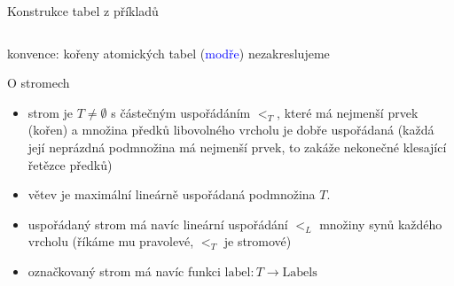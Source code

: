 \documentclass{beamer}
\begin{document}
\begin{frame}{Konstrukce tabel z příkladů}
\begin{center}
{\begin{columns}
    \end{columns}

    }

    \pause
    \alert{konvence:} kořeny atomických tabel (\textcolor{blue}{modře}) nezakreslujeme   

    \end{center}    

\end{frame}


\begin{frame}{O stromech}
    
    \begin{itemize}
        \item \alert{strom} je $T\neq\emptyset$ s částečným uspořádáním $<_T$, které má nejmenší prvek (\alert{kořen}) a množina předků libovolného vrcholu je \alert{dobře uspořádaná} \pause(každá její neprázdná podmnožina má nejmenší prvek, to zakáže nekonečné klesající řetězce předků)\pause
        \item \alert{větev} je maximální lineárně uspořádaná podmnožina $T$.\pause
        \item \alert{uspořádaný strom} má navíc lineární uspořádání $<_L$ množiny synů každého vrcholu (říkáme mu \alert{pravolevé}, $<_T$ je \alert{stromové})\pause
        \item \alert{označkovaný strom} má navíc funkci $\mathrm{label}\colon T\to\mathrm{Labels}$        
    \end{itemize}

    \pause

\end{frame}
\end{document}
